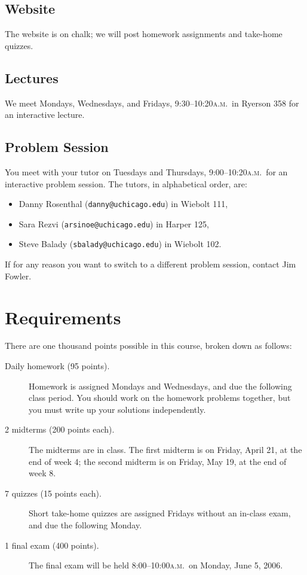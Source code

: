 \documentclass[12pt,letterpaper]{article}
\newcommand{\ayem}{\textsc{a.m.}}
\begin{document}
\subsection*{Website}
The website is on chalk; we will post homework assignments and take-home quizzes.

\subsection*{Lectures}
We meet Mondays, Wednesdays, and Fridays, 9:30--10:20\ayem\ in Ryerson
358 for an interactive lecture.

\subsection*{Problem Session}
You meet with your tutor on Tuesdays and Thursdays, 9:00--10:20\ayem\
for an interactive problem session.  The tutors, in
alphabetical order, are:
\begin{itemize}
\setlength{\itemsep}{-1ex}
\item Danny Rosenthal (\texttt{danny@uchicago.edu}) in Wiebolt 111,
\item Sara Rezvi (\texttt{arsinoe@uchicago.edu}) in Harper 125,
\item Steve Balady (\texttt{sbalady@uchicago.edu}) in Wiebolt 102.
\end{itemize}
If for any reason you want to switch to a different problem session,
contact Jim Fowler.
\pagebreak

\section*{Requirements}


There are one thousand points possible in this course, broken down as follows:
\begin{description}
\item[Daily homework (95 points).]  Homework is assigned Mondays and
Wednesdays, and due the following class period.  You should work on
the homework problems together, but you must write up your solutions
independently.
\item[2 midterms (200 points each).]  The midterms are in class.  The
first midterm is on Friday, April 21, at the end of week 4; the second
midterm is on Friday, May 19, at the end of week 8.
\item[7 quizzes (15 points each).]  Short take-home quizzes are
assigned Fridays without an in-class exam, and due the following
Monday.
\item[1 final exam (400 points).]  The final exam will be held
8:00--10:00\ayem\ on Monday, June 5, 2006.
\end{description}
\end{document}
